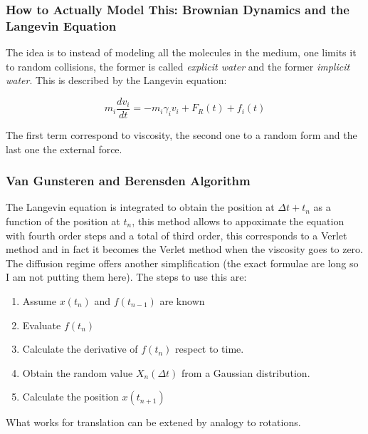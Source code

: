 \documentclass[11pt]{article}
\begin{document}
\subsubsection{How to Actually Model This: Brownian Dynamics and the Langevin Equation}
\label{sec:org33c0c7b}
The idea is to instead of modeling all the molecules in the medium, one limits it to random collisions, the former is called \emph{explicit water} and the former \emph{implicit water}. This is described by the Langevin equation:

$$m_i\frac{dv_i}{dt}= -m_i\gamma_i v_i + F_R(t) + f_i(t)$$

The first term correspond to viscosity, the second one to a random form and the last one the external force.
\subsubsection{Van Gunsteren and Berensden Algorithm}
\label{sec:orgc22e586}
The Langevin equation is integrated to obtain the position at \(\Delta t  + t_n\) as a function of the position at \(t_n\), this method allows to appoximate the equation with fourth order steps and a total of third order, this corresponds to a Verlet method and in fact it becomes the Verlet method when the viscosity goes to zero. The diffusion regime offers another simplification (the exact formulae are long so I am not putting them here). The steps to use this are:
\begin{enumerate}
\item Assume \(x(t_n)\) and \(f(t_{n-1})\) are known
\item Evaluate \(f(t_n)\)
\item Calculate the derivative of \(f(t_n)\) respect to time.
\item Obtain the random value \(X_n(\Delta t)\) from a Gaussian distribution.
\item Calculate the position \(x(t_{n+1})\)
\end{enumerate}
What works for translation can be extened by analogy to rotations.
\end{document}
